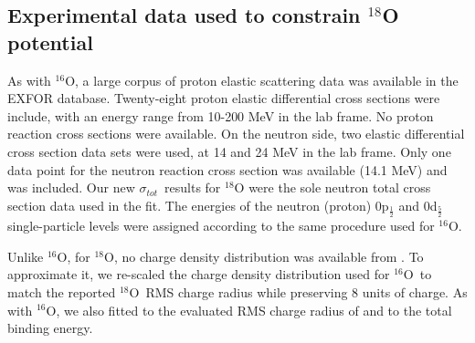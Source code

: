 \documentclass[twocolumn,secnumarabic,amssymb, nobibnotes, aps, prl,
superscriptaddress, nobalancelastpage]{revtex4}
\newcommand{\tot}{\ensuremath{\sigma_{tot}}}
\newcommand{\oSix}{\ensuremath{^{16}}O}
\newcommand{\oEight}{\ensuremath{^{18}}O}
\begin{document}
\subsection{Experimental data used to constrain $^{18}$O potential}
As with $^{16}$O, a large corpus of proton elastic scattering data was
available in the EXFOR database. Twenty-eight proton elastic differential cross
sections were include, with an energy range from 10-200 MeV in the lab frame.
No proton reaction cross sections were available. On the neutron side, two
elastic differential cross section data sets were used, at 14 and 24 MeV in the
lab frame. Only one data point for the neutron reaction cross section was available
(14.1 MeV) and was included. Our new \tot\ results for $^{18}$O were the
sole neutron total cross section data used in the fit. The energies of the
neutron (proton) 0p$_{\frac{1}{2}}$ and 0d$_{\frac{5}{2}}$ single-particle
levels were assigned according to the same procedure used for \oSix.

Unlike \oSix, for \oEight, no charge density distribution was available from
\cite{DeVries1987}. To approximate it, we re-scaled the charge density
distribution used for \oSix\ to match the reported \oEight\ RMS charge radius
while preserving 8 units of charge. As with \oSix, we also fitted to the
evaluated RMS charge radius of \cite{Angeli2013} and to the total binding
energy.
\end{document}
